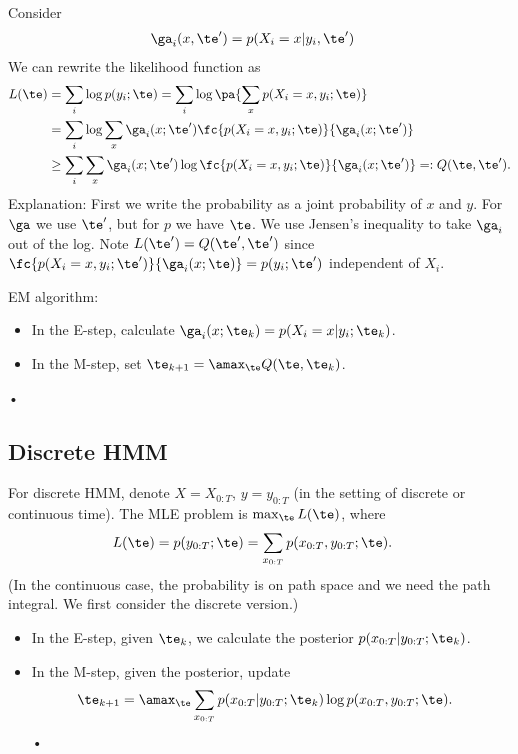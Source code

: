 Consider 
\begin{align}
\ga_i(x,\te') &=p(X_i=x|y_i,\te')
\end{align}
We can rewrite the likelihood function as
\begin{align}
L(\te)&=\sum_i \log p(y_i;\te)
= \sum_i \log\pa{\sum_x p(X_i=x,y_i;\te)}\\
&=\sum_i \log \sum_x \ga_i(x;\te') \fc{p(X_i=x,y_i;\te)}{\ga_i(x;\te')}\\
&\ge \sum_i \sum_x \ga_i(x;\te') \log \fc{p(X_i=x,y_i;\te)}{\ga_i(x;\te')}
=: Q(\te, \te').
\end{align}
Explanation: 
First we write the probability as a joint probability of $x$ and $y$. For $\ga$ we use $\te'$, but for $p$ we have $\te$. We use Jensen's inequality to take $\ga_i$ out of the log. Note $L(\te')=Q(\te',\te')$ since $\fc{p(X_i=x,y_i;\te')}{\ga_i(x;\te)}=p(y_i;\te')$ independent of $X_i$. 

EM algorithm:
\begin{itemize}
\item
In the E-step, calculate $\ga_i(x;\te_k) = p(X_i=x|y_i;\te_k)$. 
\item
In the M-step, set $\te_{k+1}=\amax_\te Q(\te, \te_k)$.
\end{itemize}•
\subsection{Discrete HMM}
For discrete HMM, %
denote $X=X_{0:T}$, $y=y_{0:T}$ (in the setting of discrete or continuous time). The MLE problem is $\max_\te L(\te)$,  where
\begin{align}
L(\te) &= p(y_{0:T};\te) = 
\sum_{x_{0:T}}p(x_{0:T}, y_{0:T};\te).
\end{align}
(In the continuous case, the probability is on path space and we need the path integral. We first consider the discrete version.)
\begin{itemize}
\item
In the E-step, given $\te_k$, we calculate the posterior $p(x_{0:T}|y_{0:T}; \te_k)$. 
\item
In the M-step, given the posterior, update
\begin{align}
\te_{k+1}&=\amax_\te\sum_{x_{0:T}} p(x_{0:T}|y_{0:T};\te_k) \log p(x_{0:T}, y_{0:T};\te).
\end{align}•
\end{itemize}


